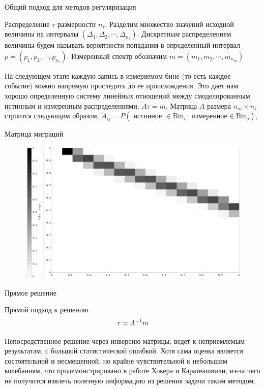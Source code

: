 \documentclass[fullscreen=true,russian,compress,%
	hyperref={unicode,bookmarks=false}]{presentation}
\begin{document}
\begin{frame}{Общий подход для методов регуляризация}

\begin{block}{}
   Распределение $\tau$ размерности $n_{\tau}$. Разделим множество значений исходной величины на интервалы 
   $(\Delta_{1}, \Delta_{2}, \cdots ,\Delta_{n_{\tau}})$. Дискретным распределением величины будем называть вероятности попадания 
   в определенный интервал $p = (p_{1}, p_{2}, \cdots, p_{n_{\tau}})$. Измеренный спектр обозначим $m = (m_{1}, m_{2}, \cdots, m_{n_{m}})$
\end{block}

\begin{block}{}
   На следующем этапе каждую запись в измеряемом бине (то есть каждое событие) можно напрямую проследить до ее происхождения. 
   Это дает нам хорошо определенную систему линейных отношений между смоделированным истинным и измеренным распределениями: 
   $A\tau = m$. Матрица $A$ размера $n_{m} \times n_{\tau}$ строится следующим образом, 
   $A_{ij} = P( \text{ истинное } \in \text{Bin}_{i} \mid \text{измеренное} \in \text{Bin}_{j} )$, 
\end{block}
  
\end{frame}

\begin{frame}{Матрица миграций}
\begin{figure}[!ht]
   \includegraphics[width=\linewidth]{images/gaus_mig_black.png}
\end{figure}
\end{frame}


\begin{frame}{Прямое решение}
\begin{block}{Прямой подход к решению}
   \begin{equation}
      \large
      \tau = A^{-1} m
   \end{equation}
\end{block}
\begin{block}{}
   Непосредственное решение через инверсию матрицы, ведет к неприемлемым результатам, с большой статистической
   ошибкой. Хотя сама оценка является состоятельной и несмещенной, но крайне чувствительной к небольшим колебаниям, 
   что продемонстрировано в работе Хокера и Каратеашвили, из-за чего не получится извлечь полезную информацию из решения задачи таким методом.
\end{block}
\end{frame}
\end{document}
